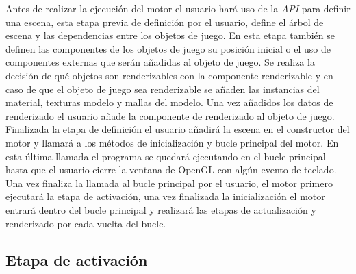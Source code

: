 \documentclass[a4paper]{book}
\begin{document}
Antes de realizar la ejecución del motor el usuario hará uso de la \textit{API} para definir una escena, esta etapa previa de definición
por el usuario, define el árbol de escena y las dependencias entre los objetos de juego. En esta etapa también se definen las
componentes de los objetos de juego su posición inicial o el uso de componentes externas que serán añadidas al objeto de juego. Se
realiza la decisión de qué objetos son renderizables con la componente renderizable y en caso de que el objeto de juego sea renderizable
se añaden las instancias del material, texturas modelo y mallas del modelo. Una vez añadidos los datos de renderizado el usuario
añade la componente de renderizado al objeto de juego. Finalizada la etapa de definición el usuario añadirá la escena en el constructor del
motor y llamará a los métodos de inicialización y bucle principal del motor. En esta última llamada el programa se quedará ejecutando en el
bucle principal hasta que el usuario cierre la ventana de OpenGL con algún evento de teclado. Una vez finaliza la llamada al bucle principal por
el usuario, el motor primero ejecutará la etapa de activación, una vez finalizada la inicialización el motor entrará dentro del bucle principal
y realizará las etapas de actualización y renderizado por cada vuelta del bucle.

\subsection{Etapa de activación}
\label{subsec:activacion}
\end{document}
